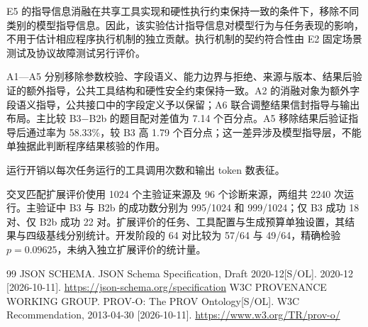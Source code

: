 \documentclass{dcfp}
\begin{document}
E5 的指导信息消融在共享工具实现和硬性执行约束保持一致的条件下，移除不同类别的模型指导信息。因此，该实验估计指导信息对模型行为与任务表现的影响，不用于估计相应程序执行机制的独立贡献。执行机制的契约符合性由 E2 固定场景测试及协议故障测试另行评价。

A1—A5 分别移除参数校验、字段语义、能力边界与拒绝、来源与版本、结果后验证的额外指导，公共工具结构和硬性安全约束保持一致。A2 的消融对象为额外字段语义指导，公共接口中的字段定义予以保留；A6 联合调整结果信封指导与输出布局。主比较 B3−B2b 的题目配对差值为 7.14 个百分点。A5 移除结果后验证指导后通过率为 58.33\%，较 B3 高 1.79 个百分点；这一差异涉及模型指导层，不能单独据此判断程序结果核验的作用。

运行开销以每次任务运行的工具调用次数和输出 token 数表征。

交叉匹配扩展评价使用 1024 个主验证来源及 96 个诊断来源，两组共 2240 次运行。主验证中 B3 与 B2b 的成功数分别为 995/1024 和 999/1024；仅 B3 成功 18 对、仅 B2b 成功 22 对。扩展评价的任务、工具配置与生成预算单独设置，其结果与四级基线分别统计。开发阶段的 64 对比较为 57/64 与 49/64，精确检验 $p=0.09625$，未纳入独立扩展评价的统计量。

\begin{thebibliography}{99}
\RaggedRight
{} JSON SCHEMA. JSON Schema Specification, Draft 2020-12[S/OL]. 2020-12 [2026-10-11]. \url{https://json-schema.org/specification}
 W3C PROVENANCE WORKING GROUP. PROV-O: The PROV Ontology[S/OL]. W3C Recommendation, 2013-04-30 [2026-10-11]. \url{https://www.w3.org/TR/prov-o/}
\end{thebibliography}
\end{document}
